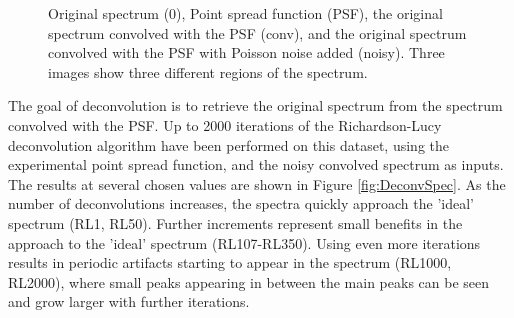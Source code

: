 \documentclass[12pt, titlepage]{article}
\begin{document}
\begin{figure}[h]
    \caption{Original spectrum (0), Point spread function (PSF), the original
        spectrum convolved with the PSF (conv), and the original spectrum convolved
        with the PSF with Poisson noise added (noisy). Three images show three
        different regions of the spectrum.
        \label{fig:RefSpec}}
\end{figure}

The goal of deconvolution is to retrieve the original spectrum from the spectrum
convolved with the PSF. Up to 2000 iterations of the Richardson-Lucy
deconvolution algorithm have been performed on this dataset, using the
experimental point spread function, and the noisy convolved spectrum as inputs.
The results at several chosen values are shown in Figure \ref{fig:DeconvSpec}.
As the number of deconvolutions increases, the spectra quickly approach the
'ideal' spectrum (RL1, RL50). Further increments represent small benefits in the
approach to the 'ideal' spectrum (RL107-RL350). Using even more iterations
results in periodic artifacts starting to appear in the spectrum (RL1000,
RL2000), where small peaks appearing in between the main peaks can be seen and
grow larger with further iterations.
\end{document}
